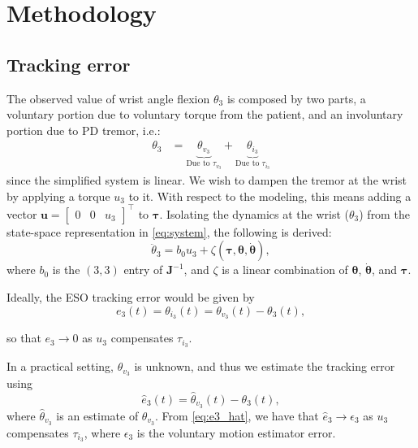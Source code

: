 \section{Methodology}
\label{sec:methodology}

\subsection{Tracking error}
The observed value of wrist angle flexion $\theta_3$ is composed by two parts,
a voluntary portion due to voluntary torque from the patient, 
and an involuntary portion due to PD tremor, i.e.:
%
\begin{align}
    \theta_3 
    &= 
        \underbrace{\theta_{v_3}}_{\text{Due to } \tau_{v_3}} + 
        \underbrace{\theta_{i_3}}_{\text{Due to } \tau_{i_3}}
\end{align}
%
since the simplified system is linear.
%
We wish to dampen the tremor at the wrist by applying a torque $u_3$ to it.
With respect to the modeling, this means adding a vector 
$\mathbf{u} = 
\begin{bmatrix}
    0 & 0 & u_3
\end{bmatrix}^\top$
to $\bm{\tau}$.
%
Isolating the dynamics at the wrist ($\theta_3$) from the state-space representation in \eqref{eq:system}, the following is derived:
%
\begin{equation}
    \ddot{\theta}_3 
    = 
    b_0 u_3 +
    \zeta(\bm{\tau}, \bm{\theta}, \dot{\bm{\theta}}),
\label{eq:wrist_dynamic}
\end{equation}
% 
where $b_0$ is the $(3,3)$ entry of $\mathbf{J}^{-1}$, and $\zeta$ is a linear combination of $\bm{\theta}$, $\dot{\bm{\theta}}$, and $\bm{\tau}$.

Ideally, the ESO tracking error would be given by
%
\begin{equation}
    e_3(t) 
    = \theta_{i_3}(t)
    = \theta_{v_3}(t) - \theta_3(t),
\end{equation}

so that $e_3\to 0$ as $u_3$ compensates $\tau_{i_3}$.

In a practical setting, $\theta_{v_3}$ is unknown, 
and thus we estimate the tracking error using
%
\begin{equation}
    \widehat{e}_3(t) 
    = \widehat{\theta}_{v_3}(t) - \theta_3(t),
\label{eq:e3_hat}
\end{equation}
%
where $\widehat{\theta}_{v_3}$ is an estimate of $\theta_{v_3}$.
From \eqref{eq:e3_hat}, 
we have that $\widehat{e}_3 \to \epsilon_3$
as $u_3$ compensates $\tau_{i_3}$,
where $\epsilon_3$ is the voluntary motion estimator error.
    
